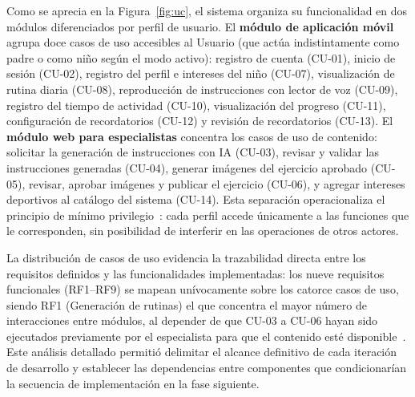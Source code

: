				Como se aprecia en la Figura~\ref{fig:uc}, el sistema organiza su funcionalidad en dos módulos diferenciados por perfil de usuario. El \textbf{módulo de aplicación móvil} agrupa doce casos de uso accesibles al Usuario (que actúa indistintamente como padre o como niño según el modo activo): registro de cuenta (CU-01), inicio de sesión (CU-02), registro del perfil e intereses del niño (CU-07), visualización de rutina diaria (CU-08), reproducción de instrucciones con lector de voz (CU-09), registro del tiempo de actividad (CU-10), visualización del progreso (CU-11), configuración de recordatorios (CU-12) y revisión de recordatorios (CU-13). El \textbf{módulo web para especialistas} concentra los casos de uso de contenido: solicitar la generación de instrucciones con IA (CU-03), revisar y validar las instrucciones generadas (CU-04), generar imágenes del ejercicio aprobado (CU-05), revisar, aprobar imágenes y publicar el ejercicio (CU-06), y agregar intereses deportivos al catálogo del sistema (CU-14). Esta separación operacionaliza el principio de mínimo privilegio~\cite{LOPDP2021}: cada perfil accede únicamente a las funciones que le corresponden, sin posibilidad de interferir en las operaciones de otros actores.
				
				La distribución de casos de uso evidencia la trazabilidad directa entre los requisitos definidos y las funcionalidades implementadas: los nueve requisitos funcionales (RF1--RF9) se mapean unívocamente sobre los catorce casos de uso, siendo RF1 (Generación de rutinas) el que concentra el mayor número de interacciones entre módulos, al depender de que CU-03 a CU-06 hayan sido ejecutados previamente por el especialista para que el contenido esté disponible~\cite{GuerreroUlloa2024,Fowler2002}. Este análisis detallado permitió delimitar el alcance definitivo de cada iteración de desarrollo y establecer las dependencias entre componentes que condicionarían la secuencia de implementación en la fase siguiente.
	
				
				\newcommand{\cuheader}[2]{%
					\rowcolor{headblue}\multicolumn{2}{c}{\textbf{\color{white}Caso de uso ``#2''}}%
				}
				\newcommand{\cuheadercont}[1]{%
					\hline\rowcolor{headblue}\multicolumn{2}{c}{\textbf{\color{white}Caso de uso ``#1'' (continuación)}}%
				}
				
